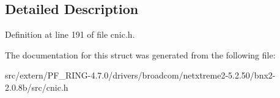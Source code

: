 \subsection{Detailed Description}


Definition at line 191 of file cnic.h.



The documentation for this struct was generated from the following file:\begin{DoxyCompactItemize}
\item 
src/extern/PF\_\-RING-\/4.7.0/drivers/broadcom/netxtreme2-\/5.2.50/bnx2-\/2.0.8b/src/cnic.h\end{DoxyCompactItemize}
